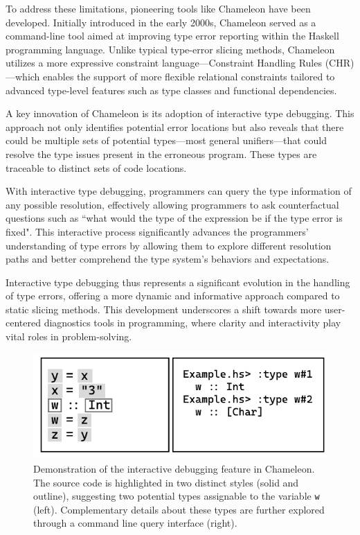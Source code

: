 To address these limitations, pioneering tools like Chameleon \cite{Stuckey2003-pz} have been developed. Initially introduced in the early 2000s, Chameleon served as a command-line tool aimed at improving type error reporting within the Haskell programming language. Unlike typical type-error slicing methods, Chameleon utilizes a more expressive constraint language—Constraint Handling Rules (CHR)—which enables the support of more flexible relational constraints tailored to advanced type-level features such as type classes and functional dependencies.

A key innovation of Chameleon is its adoption of interactive type debugging. This approach not only identifies potential error locations but also reveals that there could be multiple sets of potential types—most general unifiers—that could resolve the type issues present in the erroneous program. These types are traceable to distinct sets of code locations.

With interactive type debugging, programmers can query the type information of any possible resolution, effectively allowing programmers to ask counterfactual questions such as ``what would the type of the expression be if the type error is fixed". This interactive process significantly advances the programmers' understanding of type errors by allowing them to explore different resolution paths and better comprehend the type system's behaviors and expectations.

Interactive type debugging thus represents a significant evolution in the handling of type errors, offering a more dynamic and informative approach compared to static slicing methods. This development underscores a shift towards more user-centered diagnostics tools in programming, where clarity and interactivity play vital roles in problem-solving.

\begin{figure}[hbt]
  \centering
  \includegraphics[width=0.8\linewidth]{ChameleonInteractive}
  \caption[Demonstration of the interactive debugging feature in Chameleon]{
    \label{fig:chameleon-interactive}
    Demonstration of the interactive debugging feature in Chameleon. The source code is highlighted in two distinct styles (solid and outline), suggesting two potential types assignable to the variable \texttt{w} (left). Complementary details about these types are further explored through a command line query interface (right). }
\end{figure}

